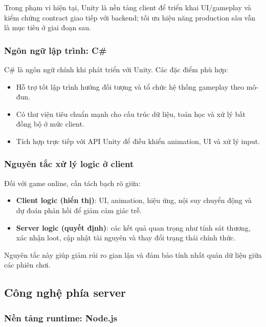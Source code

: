 Trong phạm vi hiện tại, Unity là nền tảng client để triển khai UI/\allowbreak gameplay và kiểm chứng contract giao tiếp với backend; tối ưu hiệu năng production sâu vẫn là mục tiêu ở giai đoạn sau.

\subsubsection{Ngôn ngữ lập trình: C\#}

C\# là ngôn ngữ chính khi phát triển với Unity\cite{csharp-lang}. Các đặc điểm phù hợp:
\begin{itemize}
    \item Hỗ trợ tốt lập trình hướng đối tượng và tổ chức hệ thống gameplay theo mô-đun.
    \item Có thư viện tiêu chuẩn mạnh cho cấu trúc dữ liệu, toán học và xử lý bất đồng bộ ở mức client.
    \item Tích hợp trực tiếp với API Unity để điều khiển animation, UI và xử lý input\cite{unity-manual}.
\end{itemize}

\subsubsection{Nguyên tắc xử lý logic ở client}

Đối với game online, cần tách bạch rõ giữa:
\begin{itemize}
    \item \textbf{Client logic (hiển thị)}: UI, animation, hiệu ứng, nội suy chuyển động và dự đoán phản hồi để giảm cảm giác trễ.
    \item \textbf{Server logic (quyết định)}: các kết quả quan trọng như tính sát thương, xác nhận loot, cập nhật tài nguyên và thay đổi trạng thái chính thức\cite{moriarty-networked}.
\end{itemize}
Nguyên tắc này giúp giảm rủi ro gian lận và đảm bảo tính nhất quán dữ liệu giữa các phiên chơi.

\subsection{Công nghệ phía server}

\subsubsection{Nền tảng runtime: Node.js}

